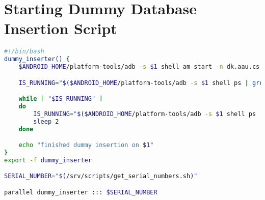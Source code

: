 \chapter{Starting Dummy Database Insertion Script}\label{app:start_wait_db_inserter_parallel}
\begin{lstlisting}[language=bash,caption=Script that starts and waits for the dummy database insertion app in parallel on all connected devices,label=lst:start_wait_db_inserter_parallel]
#!/bin/bash
dummy_inserter() {
    $ANDROID_HOME/platform-tools/adb -s $1 shell am start -n dk.aau.cs.giraf.dummydbinserter/dk.aau.cs.giraf.dummy$

    IS_RUNNING="$($ANDROID_HOME/platform-tools/adb -s $1 shell ps | grep dk.aau.cs.giraf.dummydbinserter)"

    while [ "$IS_RUNNING" ]
    do
        IS_RUNNING="$($ANDROID_HOME/platform-tools/adb -s $1 shell ps | grep dk.aau.cs.giraf.dummydbinserter)"
        sleep 2
    done

    echo "finished dummy insertion on $1"
}
export -f dummy_inserter

SERIAL_NUMBER="$(/srv/scripts/get_serial_numbers.sh)"

parallel dummy_inserter ::: $SERIAL_NUMBER
\end{lstlisting}